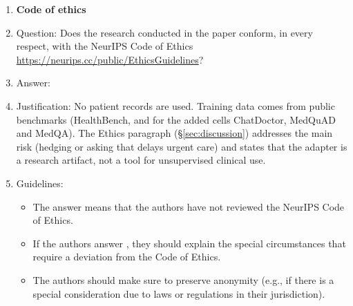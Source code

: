 \begin{enumerate}
\item {\bf Code of ethics}
    \item[] Question: Does the research conducted in the paper conform, in every respect, with the NeurIPS Code of Ethics \url{https://neurips.cc/public/EthicsGuidelines}?
    \item[] Answer: \answerYes{}
    \item[] Justification: No patient records are used. Training data comes from public benchmarks (HealthBench, and for the added cells ChatDoctor, MedQuAD and MedQA). The Ethics paragraph (\S\ref{sec:discussion}) addresses the main risk (hedging or asking that delays urgent care) and states that the adapter is a research artifact, not a tool for unsupervised clinical use.
    \item[] Guidelines:
    \begin{itemize}
        \item The answer \answerNA{} means that the authors have not reviewed the NeurIPS Code of Ethics.
        \item If the authors answer \answerNo, they should explain the special circumstances that require a deviation from the Code of Ethics.
        \item The authors should make sure to preserve anonymity (e.g., if there is a special consideration due to laws or regulations in their jurisdiction).
    \end{itemize}


\end{enumerate}
